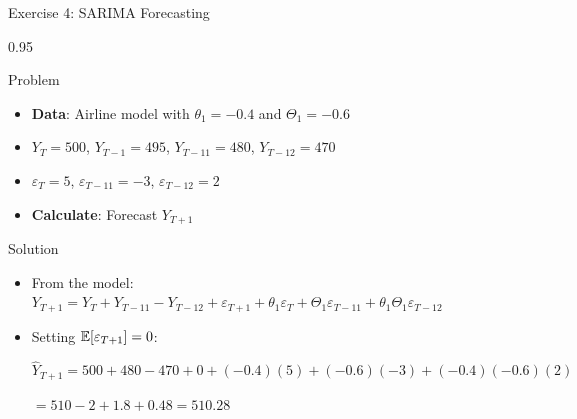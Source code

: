 \documentclass[9pt, aspectratio=169, t]{beamer}
\begin{document}
\begin{frame}{Exercise 4: SARIMA Forecasting}
    \begin{cminipage}{0.95\textwidth}
    \begin{alertblock}{Problem}
        \begin{itemize}\setlength{\itemsep}{0pt}
            \item \textbf{Data}: Airline model with $\theta_1 = -0.4$ and $\Theta_1 = -0.6$
            \item $Y_T = 500$, $Y_{T-1} = 495$, $Y_{T-11} = 480$, $Y_{T-12} = 470$
            \item $\varepsilon_T = 5$, $\varepsilon_{T-11} = -3$, $\varepsilon_{T-12} = 2$
            \item \textbf{Calculate}: Forecast $Y_{T+1}$
        \end{itemize}
    \end{alertblock}

    \vspace{0.2cm}
    \begin{exampleblock}{Solution}
        \begin{itemize}\setlength{\itemsep}{0pt}
            \item From the model: $Y_{T+1} = Y_T + Y_{T-11} - Y_{T-12} + \varepsilon_{T+1} + \theta_1 \varepsilon_T + \Theta_1 \varepsilon_{T-11} + \theta_1 \Theta_1 \varepsilon_{T-12}$
            \item Setting $\mathbb{E}[\varepsilon_{T+1}] = 0$:

            $\hat{Y}_{T+1} = 500 + 480 - 470 + 0 + (-0.4)(5) + (-0.6)(-3) + (-0.4)(-0.6)(2)$

            $= 510 - 2 + 1.8 + 0.48 = \mathbf{510.28}$
        \end{itemize}
    \end{exampleblock}
    \end{cminipage}
\end{frame}
\end{document}
